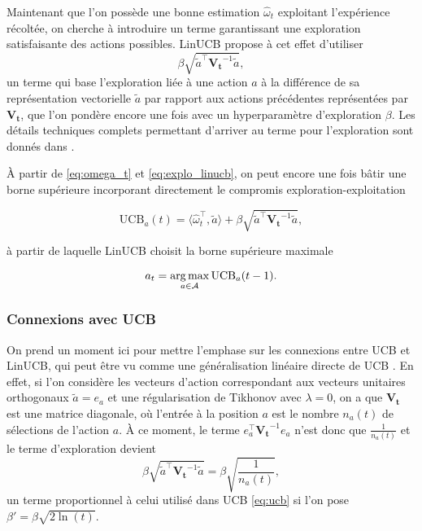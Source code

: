 Maintenant que l'on possède une bonne estimation $\hat{\omega}_t$ 
exploitant l'expérience récoltée, on cherche à introduire un terme garantissant une exploration 
satisfaisante des actions possibles.
LinUCB propose à cet effet d'utiliser 
\begin{equation}
    \beta\sqrt{\tilde{a}^\top \mathbf{V_t}^{-1} \tilde{a}},
    \label{eq:explo_linucb}
\end{equation}
un terme qui base l'exploration liée à une action $a$ à la différence de sa 
représentation vectorielle $\tilde{a}$ par rapport 
aux actions précédentes représentées par $\mathbf{V_t}$, que l'on pondère
encore une fois avec un hyperparamètre d'exploration $\beta$.
Les détails techniques complets permettant d'arriver au terme pour l'exploration sont 
donnés dans \citep{abbasi2011improved}.

À partir de \eqref{eq:omega_t} et \eqref{eq:explo_linucb}, on peut encore une fois 
bâtir une borne supérieure incorporant directement le compromis exploration-exploitation 

\begin{equation}
    \text{UCB}_a(t) = \langle \hat{\omega}_t^\top, \tilde{a} \rangle +  \beta\sqrt{\tilde{a}^\top \mathbf{V_t}^{-1} \tilde{a}},
    \label{eq:linucb}
\end{equation}

à partir de laquelle LinUCB choisit la borne supérieure maximale 

\begin{equation*}
    a_t = \operatorname*{arg\,max}_{a \in \mathcal{A}} \text{UCB}_a(t-1).
    \label{eq:linucb_selection}
\end{equation*}



\subsubsection*{Connexions avec UCB}

On prend un moment ici pour mettre l'emphase sur les connexions entre UCB et 
LinUCB, qui peut être vu comme une généralisation linéaire directe de UCB
 \citep{banditalgs}. 
En effet, si l'on considère les vecteurs d'action correspondant aux vecteurs unitaires
orthogonaux $\tilde{a} = e_a$ et une régularisation de Tikhonov avec $\lambda = 0$, on 
a que $\mathbf{V_t}$ est une matrice diagonale, où l'entrée à la position $a$ est le
nombre $n_a(t)$ de sélections de l'action $a$.
À ce moment, le terme $e_a^\top \mathbf{V_t}^{-1} e_a$ n'est 
donc que $\frac{1}{n_a(t)}$ et le 
terme d'exploration devient
\begin{equation*}
    \beta\sqrt{\tilde{a}^\top \mathbf{V_t}^{-1} \tilde{a}} = \beta\sqrt{\frac{1}{n_a(t)}},
\end{equation*}
un terme proportionnel à celui utilisé dans UCB \eqref{eq:ucb}
si l'on pose $\beta' = \beta\sqrt{2\ln(t)}$.

